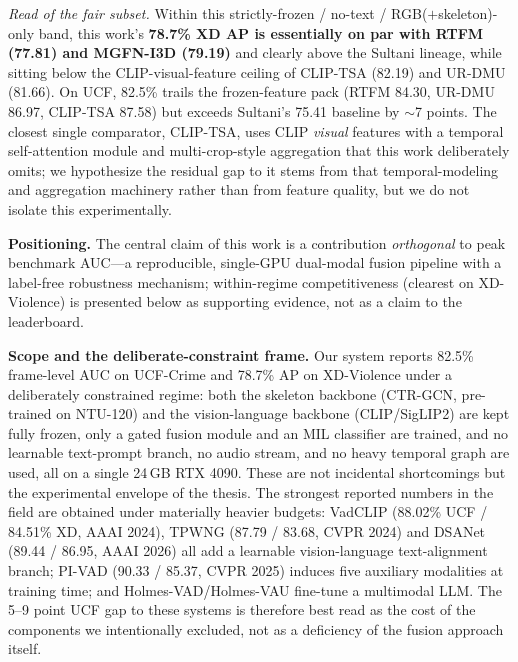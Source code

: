 \begin{table}[t]
\vspace{2pt}
\footnotesize
\begin{flushleft}
\textit{Read of the fair subset.} Within this strictly-frozen / no-text /
RGB($+$skeleton)-only band, this work's \textbf{78.7\% XD AP is essentially on
par with RTFM (77.81) and MGFN-I3D (79.19)} and clearly
above the Sultani lineage, while sitting below the CLIP-visual-feature ceiling
of CLIP-TSA (82.19) and UR-DMU (81.66). On UCF, 82.5\% trails the frozen-feature
pack (RTFM 84.30, UR-DMU 86.97, CLIP-TSA 87.58) but exceeds Sultani's 75.41
baseline by $\sim$7 points. The closest single comparator, CLIP-TSA, uses CLIP
\emph{visual} features with a temporal self-attention module and
multi-crop-style aggregation that this work deliberately omits; we hypothesize
the residual gap to it stems from that temporal-modeling and aggregation
machinery rather than from feature quality, but we do not isolate this
experimentally.
\end{flushleft}
\end{table}

\medskip

\noindent\textbf{Positioning.} The central claim of this work is a contribution
\emph{orthogonal} to peak benchmark AUC---a reproducible, single-GPU dual-modal
fusion pipeline with a label-free robustness mechanism; within-regime
competitiveness (clearest on XD-Violence) is presented below as supporting
evidence, not as a claim to the leaderboard.\par\medskip

\noindent\textbf{Scope and the deliberate-constraint frame.}
Our system reports 82.5\% frame-level AUC on UCF-Crime and 78.7\% AP on
XD-Violence under a deliberately constrained regime: both the skeleton backbone
(CTR-GCN, pre-trained on NTU-120) and the vision-language backbone
(CLIP/SigLIP2) are kept fully frozen, only a gated fusion module and an MIL
classifier are trained, and no learnable text-prompt branch, no audio stream,
and no heavy temporal graph are used, all on a single 24\,GB RTX 4090. These are
not incidental shortcomings but the experimental envelope of the thesis. The
strongest reported numbers in the field are obtained under materially heavier
budgets: VadCLIP (88.02\% UCF / 84.51\% XD, AAAI 2024), TPWNG (87.79 / 83.68,
CVPR 2024) and DSANet (89.44 / 86.95, AAAI 2026) all add a learnable
vision-language text-alignment branch; PI-VAD (90.33 / 85.37, CVPR 2025) induces
five auxiliary modalities at training time; and Holmes-VAD/Holmes-VAU fine-tune
a multimodal LLM. The 5--9 point UCF gap to these systems is therefore best read
as the cost of the components we intentionally excluded, not as a deficiency of
the fusion approach itself.


